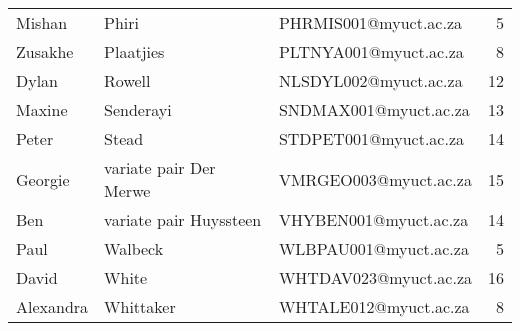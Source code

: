 \documentclass[
  letterpaper,
  DIV=11,
  numbers=noendperiod]{scrartcl}
\begin{document}
\begin{longtable}[]{@{}lllr@{}}
Mishan & Phiri & PHRMIS001@myuct.ac.za & 5 \\
Zusakhe & Plaatjies & PLTNYA001@myuct.ac.za & 8 \\
Dylan & Rowell & NLSDYL002@myuct.ac.za & 12 \\
Maxine & Senderayi & SNDMAX001@myuct.ac.za & 13 \\
Peter & Stead & STDPET001@myuct.ac.za & 14 \\
Georgie & variate pair Der Merwe & VMRGEO003@myuct.ac.za & 15 \\
Ben & variate pair Huyssteen & VHYBEN001@myuct.ac.za & 14 \\
Paul & Walbeck & WLBPAU001@myuct.ac.za & 5 \\
David & White & WHTDAV023@myuct.ac.za & 16 \\
Alexandra & Whittaker & WHTALE012@myuct.ac.za & 8 \\
\bottomrule()
\end{longtable}
\end{document}
